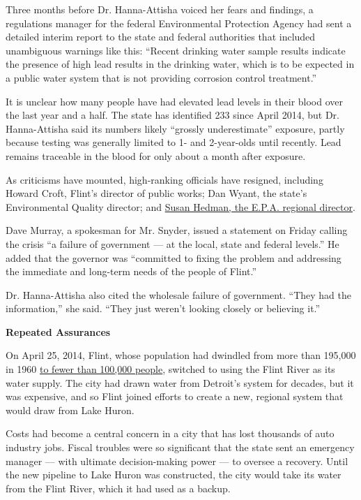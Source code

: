 Three months before Dr. Hanna-Attisha voiced her fears and findings, a
regulations manager for the federal Environmental Protection Agency had
sent a detailed interim report to the state and federal authorities that
included unambiguous warnings like this: ``Recent drinking water sample
results indicate the presence of high lead results in the drinking
water, which is to be expected in a public water system that is not
providing corrosion control treatment.''

It is unclear how many people have had elevated lead levels in their
blood over the last year and a half. The state has identified 233 since
April 2014, but Dr. Hanna-Attisha said its numbers likely ``grossly
underestimate'' exposure, partly because testing was generally limited
to 1- and 2-year-olds until recently. Lead remains traceable in the
blood for only about a month after exposure.

As criticisms have mounted, high-ranking officials have resigned,
including Howard Croft, Flint's director of public works; Dan Wyant, the
state's Environmental Quality director; and
\href{http://www.nytimes.com/2016/01/22/us/flint-fallout-a-resignation-a-hearing-and-us-aid.html}{Susan
Hedman, the E.P.A. regional director}.

Dave Murray, a spokesman for Mr. Snyder, issued a statement on Friday
calling the crisis ``a failure of government --- at the local, state and
federal levels.'' He added that the governor was ``committed to fixing
the problem and addressing the immediate and long-term needs of the
people of Flint.''

Dr. Hanna-Attisha also cited the wholesale failure of government. ``They
had the information,'' she said. ``They just weren't looking closely or
believing it.''

\textbf{Repeated Assurances}

On April 25, 2014, Flint, whose population had dwindled from more than
195,000 in 1960
\href{http://quickfacts.census.gov/qfd/states/26/2629000.html}{to fewer
than 100,000 people}, switched to using the Flint River as its water
supply. The city had drawn water from Detroit's system for decades, but
it was expensive, and so Flint joined efforts to create a new, regional
system that would draw from Lake Huron.

Costs had become a central concern in a city that has lost thousands of
auto industry jobs. Fiscal troubles were so significant that the state
sent an emergency manager --- with ultimate decision-making power --- to
oversee a recovery. Until the new pipeline to Lake Huron was
constructed, the city would take its water from the Flint River, which
it had used as a backup.

